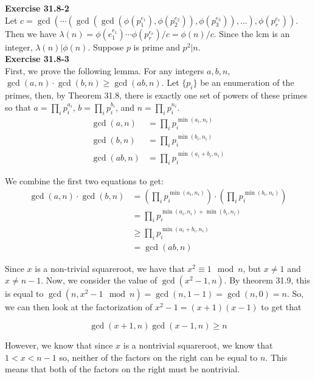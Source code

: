 \documentclass{article}
\begin{document}
\noindent\textbf{Exercise 31.8-2}\\

Let $c = \gcd( \cdots (\gcd(\gcd(\phi(p_1^{e_1}),\phi(p_2^{e_2})), \phi(p_3^{e_3})), \ldots),\phi(p_r^{e_r}))$.  Then we have $\lambda(n) = \phi(e_1^{e_1}) \cdots \phi(p_r^{e_r}) / c = \phi(n)/c$.  Since the lcm is an integer, $\lambda(n) | \phi(n)$.  Suppose $p$ is prime and $p^2 | n$. \\


\noindent\textbf{Exercise 31.8-3}\\

First, we prove the following lemma. For any integers $a,b,n$, $\gcd(a,n) \cdot \gcd(b,n) \ge \gcd(ab,n)$. Let $\{p_i\}$ be an enumeration of the primes, then, by Theorem 31.8, there is exactly one set of powers of these primes so that $a = \prod_{i} p_i^{a_i}$, $b = \prod_{i} p_i^{b_i}$, and $n = \prod_{i} p_i^{n_i}$. 
\begin{align*}
\gcd(a,n) &= \prod_i p_i^{\min(a_i,n_i)}\\
\gcd(b,n) &= \prod_i p_i^{\min(b_i,n_i)}\\
\gcd(ab,n) &= \prod_i p_i^{\min(a_i+b_i,n_i)}
\end{align*}

We combine the first two equations to get:
\begin{align*}
\gcd(a,n)\cdot \gcd(b,n) &= \left(\prod_i p_i^{\min(a_i,n_i)}\right) \cdot\left( \prod_i p_i^{\min(b_i,n_i)}\right)\\
 &= \prod_i p_i^{\min(a_i,n_i) + \min(b_i,n_i)}\\
 &\ge \prod_i p_i^{\min(a_i+b_i,n_i)}\\
 &= \gcd(ab,n)
\end{align*}


Since $x$ is a non-trivial squareroot, we have that $x^2 \equiv 1 \mod n$, but $x\neq 1$ and $x\neq n-1$. Now, we consider the value of $\gcd(x^2-1,n)$. By theorem 31.9, this is equal to $\gcd(n, x^2-1\mod n) = \gcd(n,1-1) = \gcd(n,0) = n$. So, we can then look at the factorization of $x^2-1 = (x+1)(x-1)$ to get that

\[
\gcd(x+1,n)\gcd(x-1,n) \ge n
\]

However, we know that since $x$ is a nontrivial squareroot, we know that $1 < x < n-1$ so, neither of the factors on the right can be equal to $n$. This means that both of the factors on the right must be nontrivial.\\
\end{document}
